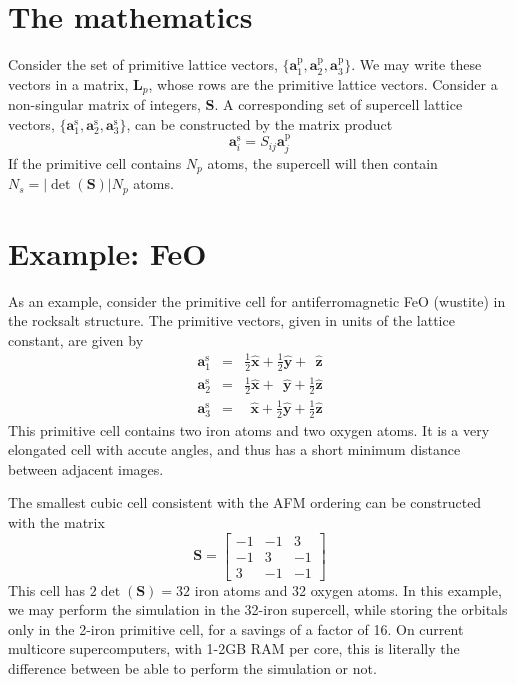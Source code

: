 \documentclass{article}
\begin{document}
\section{The mathematics}
\newcommand{\vp}{\mathbf{a}^\text{p}}
\newcommand{\vs}{\mathbf{a}^\text{s}} 
\newcommand{\Smat}{\mathbf{S}}
Consider the set of primitive lattice vectors, $\{\vp_1, \vp_2,
\vp_3\}$.  We may write these vectors in a matrix, $\mathbf{L}_p$, whose
rows are the primitive lattice vectors.  Consider a non-singular
matrix of integers, $\Smat$.  A corresponding set of supercell lattice
vectors, $\{\vs_1, \vs_2, \vs_3\}$, can be constructed by the matrix
product 
\begin{equation}
\vs_i = S_{ij} \vp_j
\end{equation}
If the primitive cell contains $N_p$ atoms, the supercell will then
contain $N_s = |\det(\Smat)| N_p$ atoms.

\section{Example: FeO}
As an example, consider the primitive cell for antiferromagnetic FeO
(wustite) in the rocksalt structure.  The primitive vectors, given in
units of the lattice constant, are given by
\newcommand{\xv}{\hat{\mathbf{x}}} 
\newcommand{\yv}{\hat{\mathbf{y}}}
\newcommand{\zv}{\hat{\mathbf{z}}}
\begin{eqnarray}
\vs_1 & = & \frac{1}{2}\xv + \frac{1}{2}\yv +      \ \   \zv \\
\vs_2 & = & \frac{1}{2}\xv +      \ \   \yv + \frac{1}{2}\zv \\
\vs_3 & = &   \ \      \xv + \frac{1}{2}\yv + \frac{1}{2}\zv 
\end{eqnarray}
This primitive cell contains two iron atoms and two oxygen atoms. It
is a very elongated cell with accute angles, and thus has a short
minimum distance between adjacent images.

The smallest cubic cell consistent with the AFM ordering can be
constructed with the matrix
\begin{equation}
\Smat = \left[\begin{array}{rrr}
  -1 & -1 &  3 \\
  -1 &  3 & -1 \\
   3 & -1 & -1 
  \end{array}\right]
\end{equation}
This cell has $2\det(\Smat) = 32$ iron atoms and 32 oxygen atoms.  In
this example, we may perform the simulation in the 32-iron supercell,
while storing the orbitals only in the 2-iron primitive cell, for a
savings of a factor of 16.  On current multicore supercomputers, with
1-2GB RAM per core, this is literally the difference between be able
to perform the simulation or not.
\end{document}
